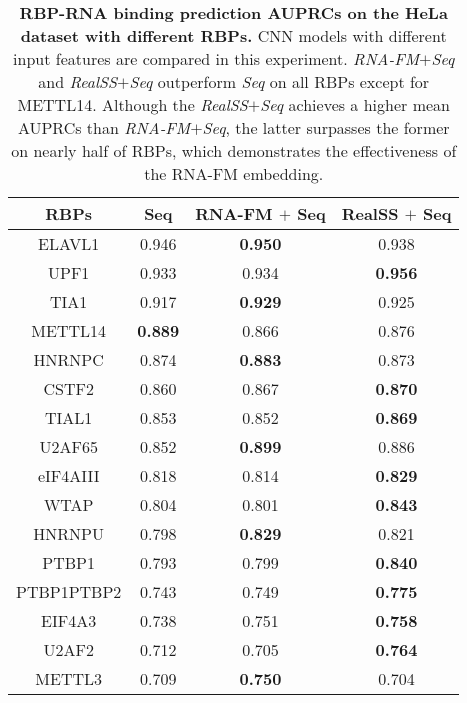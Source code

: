 \begin{table}[!t]
\centering
\caption{\textbf{ RBP-RNA binding prediction AUPRCs on the HeLa dataset with different RBPs.} CNN models with different input features are compared in this experiment. \textit{RNA-FM$+$Seq} and \textit{RealSS$+$Seq} outperform \textit{Seq} on all RBPs except for METTL14. Although the \textit{RealSS$+$Seq} achieves a higher mean AUPRCs than \textit{RNA-FM$+$Seq}, the latter surpasses the former on nearly half of RBPs, which demonstrates the effectiveness of the RNA-FM embedding.}
\label{RBP-tab}
\begin{threeparttable}

\begin{tabular}{cccc}
\toprule
RBPs          & Seq\tnote{a}         & RNA-FM $+$ Seq\tnote{b}   & RealSS $+$ Seq\tnote{c}   \\ 
\midrule
ELAVL1     & 0.946       & \textbf{0.950}          & 0.938       \\ 
UPF1       & 0.933       & 0.934         & \textbf{0.956}       \\
TIA1       & 0.917       & \textbf{0.929}         & 0.925       \\
METTL14    & \textbf{0.889}       & 0.866         & 0.876       \\
HNRNPC     & 0.874       & \textbf{0.883}         & 0.873       \\
CSTF2      & 0.860        & 0.867         & \textbf{0.870}        \\
TIAL1      & 0.853       & 0.852         & \textbf{0.869}       \\
U2AF65     & 0.852       & \textbf{0.899}         & 0.886       \\
eIF4AIII   & 0.818       & 0.814         & \textbf{0.829}       \\
WTAP       & 0.804       & 0.801         & \textbf{0.843}       \\
HNRNPU     & 0.798       & \textbf{0.829}         & 0.821       \\
PTBP1      & 0.793       & 0.799         & \textbf{0.840}        \\
PTBP1PTBP2 & 0.743       & 0.749         & \textbf{0.775}       \\
EIF4A3     & 0.738       & 0.751         & \textbf{0.758}       \\
U2AF2      & 0.712       & 0.705         & \textbf{0.764}       \\
METTL3     & 0.709       & \textbf{0.750}          & 0.704       \\

\end{tabular}
\end{threeparttable}
\end{table}
